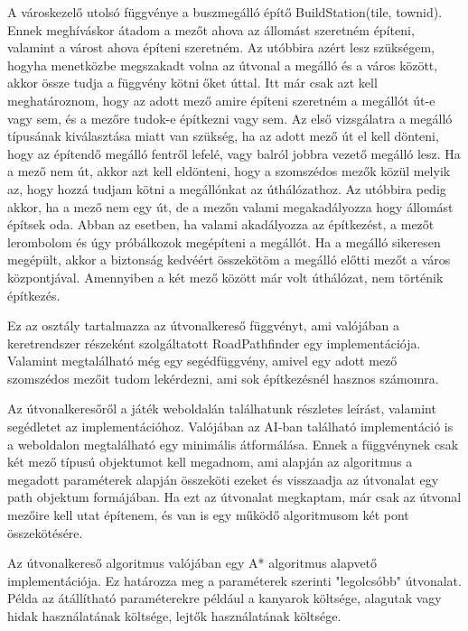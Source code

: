 A városkezelő utolsó függvénye a buszmegálló építő BuildStation(tile, townid). Ennek meghíváskor átadom a mezőt ahova az állomást szeretném építeni, valamint a várost ahova építeni szeretném. Az utóbbira azért lesz szükségem, hogyha menetközbe megszakadt volna az útvonal a megálló és a város között, akkor össze tudja a függvény kötni őket úttal. Itt már csak azt kell meghatároznom, hogy az adott mező amire építeni szeretném a megállót út-e vagy sem, és a mezőre tudok-e építkezni vagy sem. Az első vizsgálatra a megálló típusának kiválasztása miatt van szükség, ha az adott mező út el kell dönteni, hogy az építendő megálló fentről lefelé, vagy balról jobbra vezető megálló lesz. Ha a mező nem út, akkor azt kell eldönteni, hogy a szomszédos mezők közül melyik az, hogy hozzá tudjam kötni a megállónkat az úthálózathoz. Az utóbbira pedig akkor, ha a mező nem egy út, de a mezőn valami megakadályozza hogy állomást építsek oda. Abban az esetben, ha valami akadályozza az építkezést, a mezőt lerombolom és úgy próbálkozok megépíteni a megállót. Ha a megálló sikeresen megépült, akkor a biztonság kedvéért összekötöm a megálló előtti mezőt a város központjával. Amennyiben a két mező között már volt úthálózat, nem történik építkezés.


Ez az osztály tartalmazza az útvonalkereső függvényt, ami valójában a keretrendszer részeként szolgáltatott RoadPathfinder egy implementációja. Valamint megtalálható még egy segédfüggvény, amivel egy adott mező szomszédos mezőit tudom lekérdezni, ami sok építkezésnél hasznos számomra.

Az útvonalkeresőről a játék weboldalán találhatunk részletes leírást, valamint segédletet az implementációhoz. Valójában az AI-ban található implementáció is a weboldalon megtalálható egy minimális átformálása. Ennek a függvénynek csak két mező típusú objektumot kell megadnom, ami alapján az algoritmus a megadott paraméterek alapján összeköti ezeket és visszaadja az útvonalat egy path objektum formájában. Ha ezt az útvonalat megkaptam, már csak az útvonal mezőire kell utat építenem, és van is egy működő algoritmusom két pont összekötésére.

Az útvonalkereső algoritmus valójában egy A* algoritmus alapvető implementációja. Ez határozza meg a paraméterek szerinti "legolcsóbb" útvonalat. Példa az átállítható paraméterekre például a kanyarok költsége, alagutak vagy hidak használatának költsége, lejtők használatának költsége.


